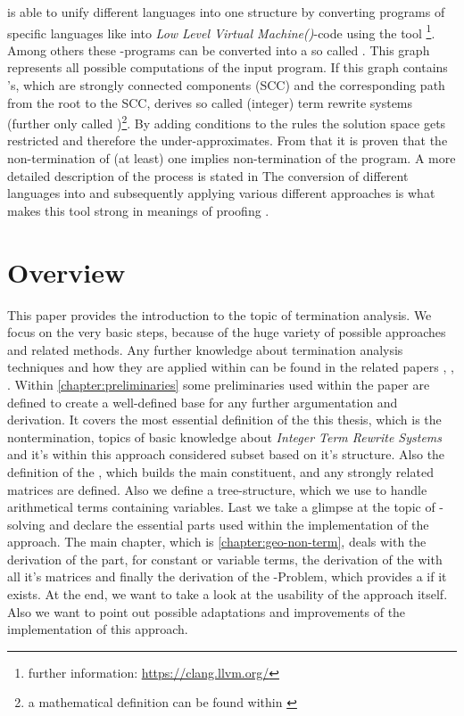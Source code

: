 \aprove is able to unify different languages into one structure by converting programs of specific languages like  into \textit{Low Level Virtual Machine(\llvm)}-code using the tool  \footnote{further information: \url{https://clang.llvm.org/}}. Among others these \llvm-programs can be converted into a so called \seg. This graph represents all possible computations of the input program. If this graph contains \lasso's, which are strongly connected components (SCC) and the corresponding path from the root to the SCC, \aprove derives so called (integer) term rewrite systems (further only called \its)\footnote{a mathematical definition can be found within \cite{fuhs2009proving}}. By adding conditions to the \its rules the solution space gets restricted and therefore the \its under-approximates. From that it is proven that the non-termination of (at least) one \its implies non-termination of the program. A more detailed description of the process is stated in \cite{hensel2017aprove} \newline
The conversion of different languages into \its and subsequently applying various different approaches is what makes this tool strong in meanings of proofing \cite{giesl2017analyzing}.

\section{Overview}
\label{sec:overview}
This paper provides the introduction to the topic of termination analysis. We focus on the very basic steps, because of the huge variety of possible approaches and related methods. Any further knowledge about termination analysis techniques and how they are applied within \aprove can be found in the related papers \cite{giesl2017analyzing}, \cite{giesl2006aprove}, \cite{giesl2003aprove}.\newline
Within \autoref{chapter:preliminaries} some preliminaries used within the paper are defined to create a well-defined base for any further argumentation and derivation. It covers the most essential definition of the this thesis, which is the nontermination, topics of basic knowledge about \textit{Integer Term Rewrite Systems} and it's within this approach considered subset based on it's structure. Also the definition of the \gna, which builds the main constituent, and any strongly related matrices are defined. Also we define a tree-structure, which we use to handle arithmetical terms containing variables. Last we take a glimpse at the topic of -solving and declare the essential parts used within the implementation of the approach.\newline
The main chapter, which is \autoref{chapter:geo-non-term}, deals with the derivation of the \stem part, for constant or variable terms, the derivation of the \loopt with all it's matrices and finally the derivation of the -Problem, which provides a \gna if it exists. \newline
At the end, we want to take a look at the usability of the approach itself. Also we want to point out possible adaptations and improvements of the implementation of this approach.